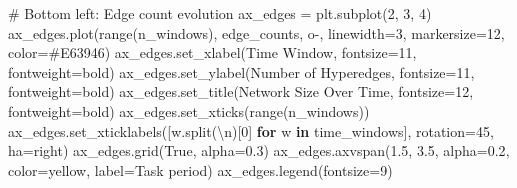 \documentclass[
  11pt,
  letterpaper,
  oneside,
  openany]{book}
\newenvironment{Shaded}{\begin{snugshade}}{\end{snugshade}}
\newcommand{\BuiltInTok}[1]{\textcolor[rgb]{0.00,0.23,0.31}{#1}}
\newcommand{\CharTok}[1]{\textcolor[rgb]{0.13,0.47,0.30}{#1}}
\newcommand{\CommentTok}[1]{\textcolor[rgb]{0.37,0.37,0.37}{#1}}
\newcommand{\ControlFlowTok}[1]{\textcolor[rgb]{0.00,0.23,0.31}{\textbf{#1}}}
\newcommand{\DecValTok}[1]{\textcolor[rgb]{0.68,0.00,0.00}{#1}}
\newcommand{\FloatTok}[1]{\textcolor[rgb]{0.68,0.00,0.00}{#1}}
\newcommand{\KeywordTok}[1]{\textcolor[rgb]{0.00,0.23,0.31}{\textbf{#1}}}
\newcommand{\NormalTok}[1]{\textcolor[rgb]{0.00,0.23,0.31}{#1}}
\newcommand{\OperatorTok}[1]{\textcolor[rgb]{0.37,0.37,0.37}{#1}}
\newcommand{\StringTok}[1]{\textcolor[rgb]{0.13,0.47,0.30}{#1}}
\newcommand{\VariableTok}[1]{\textcolor[rgb]{0.07,0.07,0.07}{#1}}
\begin{document}
\begin{Shaded}
\begin{Highlighting}[]
\CommentTok{\# Bottom left: Edge count evolution}
\NormalTok{ax\_edges }\OperatorTok{=}\NormalTok{ plt.subplot(}\DecValTok{2}\NormalTok{, }\DecValTok{3}\NormalTok{, }\DecValTok{4}\NormalTok{)}
\NormalTok{ax\_edges.plot(}\BuiltInTok{range}\NormalTok{(n\_windows), edge\_counts, }\StringTok{\textquotesingle{}o{-}\textquotesingle{}}\NormalTok{, linewidth}\OperatorTok{=}\DecValTok{3}\NormalTok{, }
\NormalTok{              markersize}\OperatorTok{=}\DecValTok{12}\NormalTok{, color}\OperatorTok{=}\StringTok{\textquotesingle{}\#E63946\textquotesingle{}}\NormalTok{)}
\NormalTok{ax\_edges.set\_xlabel(}\StringTok{\textquotesingle{}Time Window\textquotesingle{}}\NormalTok{, fontsize}\OperatorTok{=}\DecValTok{11}\NormalTok{, fontweight}\OperatorTok{=}\StringTok{\textquotesingle{}bold\textquotesingle{}}\NormalTok{)}
\NormalTok{ax\_edges.set\_ylabel(}\StringTok{\textquotesingle{}Number of Hyperedges\textquotesingle{}}\NormalTok{, fontsize}\OperatorTok{=}\DecValTok{11}\NormalTok{, fontweight}\OperatorTok{=}\StringTok{\textquotesingle{}bold\textquotesingle{}}\NormalTok{)}
\NormalTok{ax\_edges.set\_title(}\StringTok{\textquotesingle{}Network Size Over Time\textquotesingle{}}\NormalTok{, fontsize}\OperatorTok{=}\DecValTok{12}\NormalTok{, fontweight}\OperatorTok{=}\StringTok{\textquotesingle{}bold\textquotesingle{}}\NormalTok{)}
\NormalTok{ax\_edges.set\_xticks(}\BuiltInTok{range}\NormalTok{(n\_windows))}
\NormalTok{ax\_edges.set\_xticklabels([w.split(}\StringTok{\textquotesingle{}}\CharTok{\textbackslash{}n}\StringTok{\textquotesingle{}}\NormalTok{)[}\DecValTok{0}\NormalTok{] }\ControlFlowTok{for}\NormalTok{ w }\KeywordTok{in}\NormalTok{ time\_windows], }
\NormalTok{                         rotation}\OperatorTok{=}\DecValTok{45}\NormalTok{, ha}\OperatorTok{=}\StringTok{\textquotesingle{}right\textquotesingle{}}\NormalTok{)}
\NormalTok{ax\_edges.grid(}\VariableTok{True}\NormalTok{, alpha}\OperatorTok{=}\FloatTok{0.3}\NormalTok{)}
\NormalTok{ax\_edges.axvspan(}\FloatTok{1.5}\NormalTok{, }\FloatTok{3.5}\NormalTok{, alpha}\OperatorTok{=}\FloatTok{0.2}\NormalTok{, color}\OperatorTok{=}\StringTok{\textquotesingle{}yellow\textquotesingle{}}\NormalTok{, label}\OperatorTok{=}\StringTok{\textquotesingle{}Task period\textquotesingle{}}\NormalTok{)}
\NormalTok{ax\_edges.legend(fontsize}\OperatorTok{=}\DecValTok{9}\NormalTok{)}


\end{Highlighting}
\end{Shaded}
\end{document}
